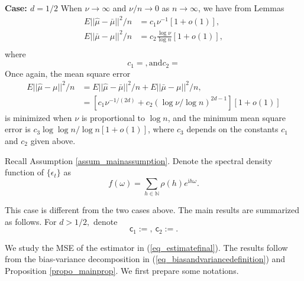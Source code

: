 \documentclass[11pt]{article}
\newcommand{\sfc}{\mathsf{c}}
\newcommand{\dd}{\mathrm{d}}
\numberwithin{equation}{section}
\numberwithin{figure}{section}
\begin{document}
\textbf{Case: $d=1/2$}
When $\nu \rightarrow \infty$ and $\nu /n \rightarrow 0$ as $n \rightarrow \infty$, we have from Lemmas 
\begin{align*}
     E||\widehat{\mu}-\bar{\mu}||^2/n & =c_{1}\nu^{-1}[1+o(1)],\\
     E||\bar{\mu}-\mu||^2/n &=c_{2}\frac{\log {\nu}}{\log {n}}[1+o(1)], \\
\end{align*}
where
\begin{equation*}
c_{1}=, \text{and} c_{2}=
\end{equation*}
Once again, the mean square error
\begin{align*}
    E||\widehat{\mu}-\mu||^2/n &=E||\widehat{\mu}-\bar{\mu}||^2/n+E||\bar{\mu}-\mu||^2/n, \\
    &=[c_{1}\nu^{-1/(2d)}+c_{2}(\log{\nu}/\log{n})^{2d-1}][1+o(1)]   
\end{align*}
is minimized when $\nu$ is proportional to $\log n$, and the minimum mean square error is $c_{3}\log{\log{n}}/\log{n}[1+o(1)]$, where $c_3$ depends on the constants $c_1$ and $c_2$ given above. 

Recall Assumption \ref{assum_mainassumption}. Denote the spectral density function of $\{\epsilon_t\}$ as
\begin{equation}\label{eq_spectraldensity}
f(\omega)=\sum_{h \in \mathbb{N}} \rho(h) e^{\mathrm{i} h \omega}. 
\end{equation}

This case is different from the two cases above.
The main results are summarized as follows. For $d>1/2,$ denote 
\begin{equation}\label{eq_c1c2}
\sfc_1:=, \ \sfc_2:=. 
\end{equation} 


\fi

We study the MSE of the estimator in (\ref{eq_estimatefinal}). The results follow from the bias-variance decomposition in (\ref{eq_biasandvariancedefinition}) and Proposition \ref{propo_mainprop}. We first prepare some notations. 
\end{document}
